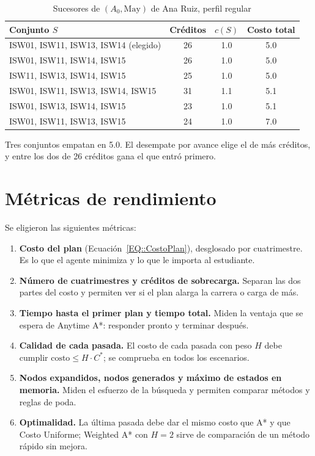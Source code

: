 \begin{table}[H]
  \begin{center}
    \caption{Sucesores de $(A_0, \text{May})$ de Ana Ruiz, perfil regular}
    \label{TAB::TransicionesAna}
    \begin{tabular}{|| l | c | c | c ||}
        \hline
        Conjunto $S$ & Créditos & $c(S)$ & Costo total \\ [0.5ex]
        \hline\hline
        ISW01, ISW11, ISW13, ISW14 (elegido) & 26 & 1.0 & 5.0 \\
        \hline
        ISW01, ISW11, ISW14, ISW15 & 26 & 1.0 & 5.0 \\
        \hline
        ISW11, ISW13, ISW14, ISW15 & 25 & 1.0 & 5.0 \\
        \hline
        ISW01, ISW11, ISW13, ISW14, ISW15 & 31 & 1.1 & 5.1 \\
        \hline
        ISW01, ISW13, ISW14, ISW15 & 23 & 1.0 & 5.1 \\
        \hline
        ISW01, ISW11, ISW13, ISW15 & 24 & 1.0 & 7.0 \\
        \hline
    \end{tabular}
  \end{center}
\end{table}

Tres conjuntos empatan en 5.0. El desempate por avance elige el de más créditos, y entre los dos de 26 créditos gana el que entró primero.

\section{Métricas de rendimiento}
Se eligieron las siguientes métricas:
\begin{enumerate}
    \item \textbf{Costo del plan} (Ecuación~\eqref{EQ::CostoPlan}), desglosado por cuatrimestre. Es lo que el agente minimiza y lo que le importa al estudiante.
    \item \textbf{Número de cuatrimestres y créditos de sobrecarga.} Separan las dos partes del costo y permiten ver si el plan alarga la carrera o carga de más.
    \item \textbf{Tiempo hasta el primer plan y tiempo total.} Miden la ventaja que se espera de Anytime A*: responder pronto y terminar después.
    \item \textbf{Calidad de cada pasada.} El costo de cada pasada con peso $H$ debe cumplir $\text{costo} \leq H \cdot C^*$; se comprueba en todos los escenarios.
    \item \textbf{Nodos expandidos, nodos generados y máximo de estados en memoria.} Miden el esfuerzo de la búsqueda y permiten comparar métodos y reglas de poda.
    \item \textbf{Optimalidad.} La última pasada debe dar el mismo costo que A* y que Costo Uniforme; Weighted A* con $H = 2$ sirve de comparación de un método rápido sin mejora.
\end{enumerate}

